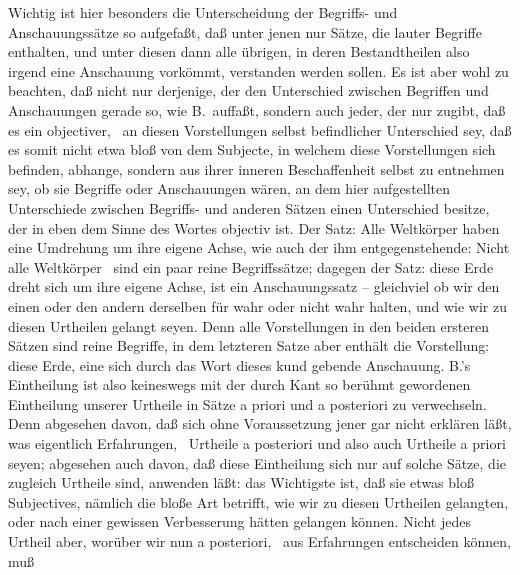 Wichtig ist hier besonders die Unterscheidung der Begriffs- und Anschauungssätze  so aufgefaßt, daß unter jenen nur Sätze, die lauter Begriffe enthalten, und unter diesen dann alle übrigen, in deren Bestandtheilen also irgend eine Anschauung vorkömmt, verstanden werden sollen. Es ist aber wohl zu beachten, daß nicht nur derjenige, der den Unterschied zwischen Begriffen und Anschauungen gerade so, wie B.\ auffaßt, sondern auch jeder, der nur zugibt, daß es ein objectiver, \dh\  an diesen Vorstellungen selbst befindlicher Unterschied sey, daß es somit nicht etwa bloß von dem Subjecte, in welchem diese Vorstellungen sich befinden, abhange, sondern aus ihrer inneren Beschaffenheit selbst zu entnehmen sey, ob sie Begriffe oder Anschauungen wären, an dem hier aufgestellten Unterschiede zwischen Begriffs- und anderen Sätzen einen Unterschied besitze, der in eben dem Sinne des Wortes objectiv ist. Der Satz: Alle Weltkörper haben eine Umdrehung um ihre eigene Achse, wie auch der ihm entgegenstehende: Nicht alle Weltkörper \usw\ sind ein paar reine Begriffssätze; dagegen der Satz: diese Erde dreht sich um ihre eigene Achse, ist ein Anschauungssatz -- gleichviel ob wir den einen oder den andern derselben für wahr oder nicht wahr halten, und wie wir zu diesen Urtheilen gelangt seyen. Denn alle Vorstellungen in den beiden ersteren Sätzen sind reine Begriffe, in dem letzteren Satze aber enthält die Vorstellung: diese Erde, eine sich durch das Wort dieses kund gebende Anschauung. B.'s Eintheilung ist also keineswegs mit der durch Kant so berühmt gewordenen Eintheilung unserer Urtheile in Sätze a priori und a posteriori zu verwechseln. Denn abgesehen davon, daß sich ohne Voraussetzung jener gar nicht erklären läßt, was eigentlich Erfahrungen, \dh\  Urtheile a posteriori und also auch Urtheile a priori seyen; abgesehen auch davon, daß diese Eintheilung sich nur auf solche Sätze, die zugleich Urtheile sind, anwenden läßt: das Wichtigste ist, daß sie etwas bloß Subjectives, nämlich die bloße Art betrifft, wie wir zu diesen Urtheilen gelangten, oder nach einer gewissen Verbesserung hätten gelangen können. Nicht jedes Urtheil aber, worüber wir nun a posteriori, \dh\ aus Erfahrungen entscheiden können, muß \par
\par
